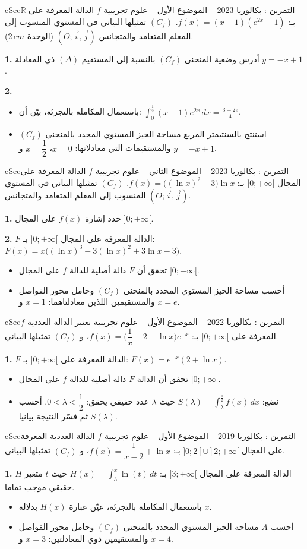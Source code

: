 \documentclass[12pt,a4paper]{article}
\newenvironment{BOX}[2]{\begin{otherlanguage}{english}\begin{arbox}{#1}{#2}}{\end{arbox}\end{otherlanguage}}
\newcounter{exo}
\newenvironment{tamrin}[1]{\stepcounter{exo}\begin{BOX}{cSec}{التمرين \theexo: #1}}{\end{BOX}}
\newcommand{\R}{\mathbb{R}}
\newenvironment{sq}{\begin{itemize}[leftmargin=2.4em,itemsep=3pt]}{\end{itemize}}
\newcommand{\qa}{\item[(أ)]}\newcommand{\qb}{\item[(ب)]}\newcommand{\qc}{\item[(جـ)]}\newcommand{\qd}{\item[(د)]}\newcommand{\qe}{\item[(هـ)]}
\newcommand{\QQ}[1]{\par\smallskip\textbf{#1.} }
\begin{document}
\begin{tamrin}{بكالوريا 2023 -- الموضوع الأول -- علوم تجريبية}
$f$ الدالة المعرفة على $\R$ بـ: $f(x)=(x-1)(e^{2x}-1)$.
$(C_f)$ تمثيلها البياني في المستوي المنسوب إلى المعلم المتعامد والمتجانس $(O;\vec i,\vec j)$ (الوحدة $2\,cm$).
\QQ{1} أدرس وضعية المنحنى $(C_f)$ بالنسبة إلى المستقيم $(\Delta)$ ذي المعادلة $y=-x+1$.
\QQ{2}
\begin{sq}
\qa باستعمال المكاملة بالتجزئة، بيّن أن: $\displaystyle\int_0^{\frac12}(x-1)e^{2x}\,dx=\frac{3-2e}{4}$.
\qb استنتج بالسنتيمتر المربع مساحة الحيز المستوي المحدد بالمنحنى $(C_f)$ والمستقيمات التي معادلاتها: $x=0$، $x=\dfrac12$ و $y=-x+1$.
\end{sq}
\end{tamrin}

\begin{tamrin}{بكالوريا 2023 -- الموضوع الثاني -- علوم تجريبية}
$f$ الدالة المعرفة على المجال $]0;+\infty[$ بـ: $f(x)=\big((\ln x)^2-3\big)\ln x$.
$(C_f)$ تمثيلها البياني في المستوي المنسوب إلى المعلم المتعامد والمتجانس $(O;\vec i,\vec j)$.
\QQ{1} حدد إشارة $f(x)$ على المجال $]0;+\infty[$.
\QQ{2} $F$ الدالة المعرفة على المجال $]0;+\infty[$ بـ: $F(x)=x\big((\ln x)^3-3(\ln x)^2+3\ln x-3\big)$.
\begin{sq}
\qa تحقق أن $F$ دالة أصلية للدالة $f$ على المجال $]0;+\infty[$.
\qb أحسب مساحة الحيز المستوي المحدد بالمنحنى $(C_f)$ وحامل محور الفواصل والمستقيمين اللذين معادلتاهما: $x=1$ و $x=e$.
\end{sq}
\end{tamrin}

\begin{tamrin}{بكالوريا 2022 -- الموضوع الأول -- علوم تجريبية}
نعتبر الدالة العددية $f$ المعرفة على $]0;+\infty[$ بـ: $f(x)=\Big(\dfrac1x-2-\ln x\Big)e^{-x}$، و $(C_f)$ تمثيلها البياني.
\QQ{1} $F$ الدالة المعرفة على $]0;+\infty[$ بـ: $F(x)=e^{-x}(2+\ln x)$.
\begin{sq}
\qa تحقق أن الدالة $F$ دالة أصلية للدالة $f$ على المجال $]0;+\infty[$.
\qb نضع: $S(\lambda)=\displaystyle\int_\lambda^{\frac12}f(x)\,dx$ حيث $\lambda$ عدد حقيقي يحقق: $0<\lambda<\dfrac12$.
أحسب $S(\lambda)$ ثم فسّر النتيجة بيانيا.
\end{sq}
\end{tamrin}

\begin{tamrin}{بكالوريا 2019 -- الموضوع الأول -- علوم تجريبية}
$f$ الدالة العددية المعرفة على المجال $]0;2[\cup]2;+\infty[$ بـ: $f(x)=\dfrac1{x-2}+\ln x$، و $(C_f)$ تمثيلها البياني.
\QQ{1} $H$ الدالة المعرفة على المجال $]3;+\infty[$ بـ: $H(x)=\displaystyle\int_3^x\ln(t)\,dt$ حيث $t$ متغير حقيقي موجب تماما.
\begin{sq}
\qa باستعمال المكاملة بالتجزئة، عيّن عبارة $H(x)$ بدلالة $x$.
\qb أحسب $A$ مساحة الحيز المستوي المحدد بالمنحنى $(C_f)$ وحامل محور الفواصل والمستقيمين ذوي المعادلتين: $x=3$ و $x=4$.
\end{sq}
\end{tamrin}
\end{document}
